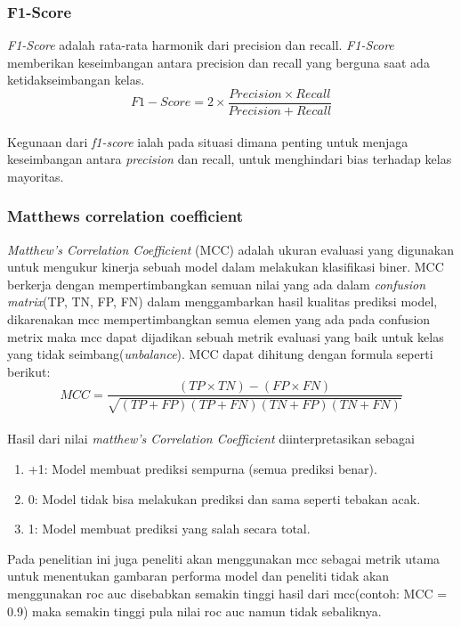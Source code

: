 \subsubsection{F1-Score}
\textit{F1-Score} adalah rata-rata harmonik dari precision dan recall. \textit{F1-Score} memberikan keseimbangan antara precision dan recall yang berguna saat ada ketidakseimbangan kelas.\\
\begin{equation}
F1-Score = 2 \times \frac{Precision \times Recall}{Precision + Recall}   
\end{equation}
\label{eq:2.f1score}
\\
Kegunaan dari \textit{f1-score} ialah pada situasi dimana penting untuk menjaga keseimbangan antara \textit{precision} dan recall, untuk menghindari bias terhadap kelas mayoritas.    

\subsubsection{Matthews correlation coefficient}
\textit{Matthew’s Correlation Coefficient} 
(MCC) adalah ukuran evaluasi yang digunakan untuk mengukur kinerja sebuah model dalam melakukan klasifikasi biner. MCC berkerja dengan mempertimbangkan semuan nilai yang ada dalam \textit{confusion matrix}(TP, TN, FP, FN) dalam menggambarkan hasil kualitas prediksi model, dikarenakan mcc mempertimbangkan semua elemen yang ada pada confusion metrix maka mcc dapat dijadikan sebuah metrik evaluasi yang baik untuk kelas yang tidak seimbang(\textit{unbalance})\cite{chicco2020advantages}. MCC dapat dihitung dengan formula seperti berikut:\\
\begin{equation}
MCC = \frac{(TP \times TN) - (FP \times FN)}{\sqrt{(TP + FP)(TP + FN)(TN + FP)(TN + FN)}} 
\end{equation}
\label{eq:2.mcc}
\\
Hasil dari nilai \textit{matthew’s Correlation Coefficient} diinterpretasikan sebagai
\begin{enumerate}[noitemsep]
    \item +1: Model membuat prediksi sempurna (semua prediksi benar).
    \item 0: Model tidak bisa melakukan prediksi dan sama seperti tebakan acak.
    \item 1: Model membuat prediksi yang salah secara total.
\end{enumerate}
Pada penelitian ini juga peneliti akan menggunakan mcc sebagai metrik utama untuk menentukan gambaran performa model dan peneliti tidak akan menggunakan roc auc disebabkan semakin tinggi hasil dari mcc(contoh: MCC = 0.9) maka semakin tinggi pula nilai roc auc namun tidak sebaliknya\cite{chicco2023matthews}.


